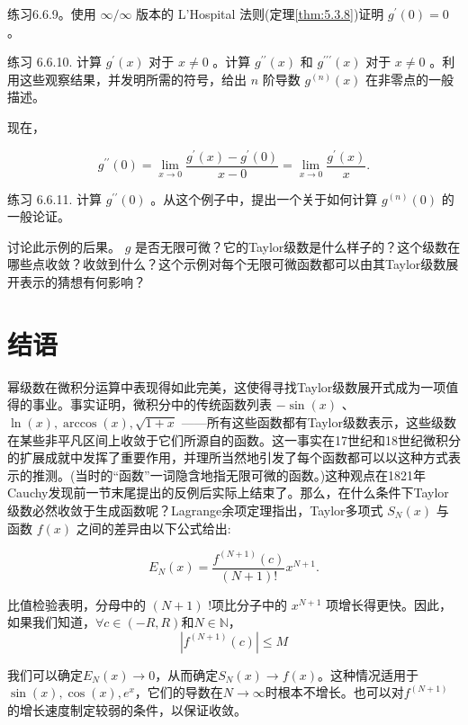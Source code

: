 练习6.6.9。使用 \(\infty /\infty\) 版本的 L'Hospital 法则(定理\ref{thm:5.3.8})证明 \({g}^{\prime }\left( 0\right)  = 0\) 。

练习 6.6.10. 计算 \({g}^{\prime }\left( x\right)\) 对于 \(x \neq  0\) 。计算 \({g}^{\prime \prime }\left( x\right)\) 和 \({g}^{\prime \prime \prime }\left( x\right)\) 对于 \(x \neq  0\) 。利用这些观察结果，并发明所需的符号，给出 \(n\) 阶导数 \({g}^{\left( n\right) }\left( x\right)\) 在非零点的一般描述。

现在，

\[
{g}^{\prime \prime }\left( 0\right)  = \mathop{\lim }\limits_{{x \rightarrow  0}}\frac{{g}^{\prime }\left( x\right)  - {g}^{\prime }\left( 0\right) }{x - 0} = \mathop{\lim }\limits_{{x \rightarrow  0}}\frac{{g}^{\prime }\left( x\right) }{x}.
\]

练习 6.6.11. 计算 \({g}^{\prime \prime }\left( 0\right)\) 。从这个例子中，提出一个关于如何计算 \({g}^{\left( n\right) }\left( 0\right)\) 的一般论证。

讨论此示例的后果。 \(g\) 是否无限可微？它的Taylor级数是什么样子的？这个级数在哪些点收敛？收敛到什么？这个示例对每个无限可微函数都可以由其Taylor级数展开表示的猜想有何影响？

\section{结语}
\label{sec:6.7}
幂级数在微积分运算中表现得如此完美，这使得寻找Taylor级数展开式成为一项值得的事业。事实证明，微积分中的传统函数列表 \(- \sin \left( x\right)\) 、 \(\ln \left( x\right) ,\arccos \left( x\right) ,\sqrt{1 + x}\) ——所有这些函数都有Taylor级数表示，这些级数在某些非平凡区间上收敛于它们所源自的函数。这一事实在17世纪和18世纪微积分的扩展成就中发挥了重要作用，并理所当然地引发了每个函数都可以以这种方式表示的推测。(当时的“函数”一词隐含地指无限可微的函数。)这种观点在1821年Cauchy发现前一节末尾提出的反例后实际上结束了。那么，在什么条件下Taylor级数必然收敛于生成函数呢？Lagrange余项定理指出，Taylor多项式 \({S}_{N}\left( x\right)\) 与函数 \(f\left( x\right)\) 之间的差异由以下公式给出:

\[
{E}_{N}\left( x\right)  = \frac{{f}^{\left( N + 1\right) }\left( c\right) }{\left( {N + 1}\right) !}{x}^{N + 1}.
\]

比值检验表明，分母中的 \(\left( {N + 1}\right)\) !项比分子中的 \({x}^{N + 1}\) 项增长得更快。因此，如果我们知道，$\forall c\in (-R,R)$和$N\in \mathbb{N}$，
$$
\left| f^{(N+1)}(c) \right|\le M 
$$

我们可以确定$E_N(x)\to 0$，从而确定$S_N(x)\to f(x)$。这种情况适用于$\sin(x),\cos(x),e^x$，它们的导数在$N\to \infty$时根本不增长。也可以对$f^{(N+1)}$的增长速度制定较弱的条件，以保证收敛。


